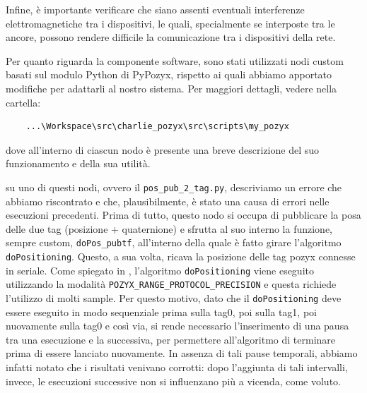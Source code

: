 Infine, è importante verificare che siano assenti eventuali interferenze elettromagnetiche tra i dispositivi, le quali, specialmente se interposte tra le ancore, 
possono rendere difficile la comunicazione tra i dispositivi della rete.

Per quanto riguarda la componente software, sono stati utilizzati nodi custom basati sul modulo Python di PyPozyx, rispetto ai quali abbiamo apportato modifiche 
per adattarli al nostro sistema. Per maggiori dettagli, vedere nella cartella:
\begin{verbatim}
	...\Workspace\src\charlie_pozyx\src\scripts\my_pozyx 
\end{verbatim}
dove all'interno di ciascun nodo è presente una breve descrizione del suo funzionamento e della sua utilità.

\vspace{0.5 cm}
su uno di questi nodi, ovvero il \verb|pos_pub_2_tag.py|, descriviamo un errore che abbiamo riscontrato e che, plausibilmente, è stato una causa
di errori nelle esecuzioni precedenti. Prima di tutto, questo nodo si occupa di pubblicare la posa delle due tag (posizione + quaternione) e sfrutta al suo interno 
la funzione, sempre custom, \verb|doPos_pubtf|, all'interno della quale è fatto girare l'algoritmo \verb|doPositioning|. Questo, a sua volta, ricava la posizione
delle tag pozyx connesse in seriale. Come spiegato in \cite{ctesconistudio}, l'algoritmo \verb|doPositioning| viene eseguito utilizzando la modalità 
\verb|POZYX_RANGE_PROTOCOL_PRECISION| e questa richiede l'utilizzo di molti sample. Per questo motivo, dato che il \verb|doPositioning| deve essere eseguito 
in modo sequenziale prima sulla tag0, poi sulla tag1, poi nuovamente sulla tag0 e così via, si rende necessario l'inserimento di una pausa tra una esecuzione 
e la successiva, per permettere all'algoritmo di terminare prima di essere lanciato nuovamente. In assenza di tali pause temporali, abbiamo infatti notato che 
i risultati venivano corrotti: dopo l'aggiunta di tali intervalli, invece, le esecuzioni successive non si influenzano più a vicenda, come voluto.

